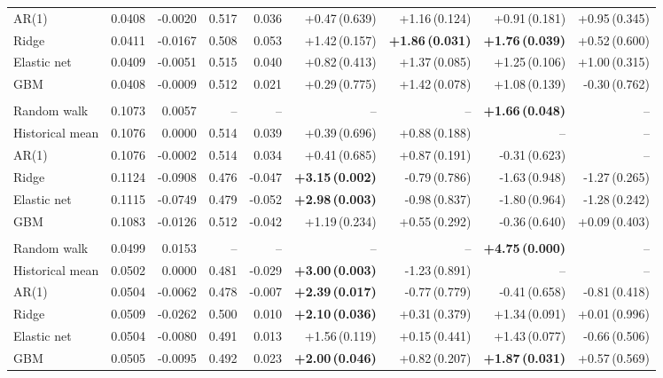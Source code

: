 \begin{tabular}{lrrrrrrrr}
\quad AR(1) & 0.0408 & -0.0020 & 0.517 & 0.036 & +0.47\,(0.639) & +1.16\,(0.124) & +0.91\,(0.181) & +0.95\,(0.345) \\
\quad Ridge & 0.0411 & -0.0167 & 0.508 & 0.053 & +1.42\,(0.157) & \textbf{+1.86\,(0.031)} & \textbf{+1.76\,(0.039)} & +0.52\,(0.600) \\
\quad Elastic net & 0.0409 & -0.0051 & 0.515 & 0.040 & +0.82\,(0.413) & +1.37\,(0.085) & +1.25\,(0.106) & +1.00\,(0.315) \\
\quad GBM & 0.0408 & -0.0009 & 0.512 & 0.021 & +0.29\,(0.775) & +1.42\,(0.078) & +1.08\,(0.139) & -0.30\,(0.762) \\
\addlinespace
\multicolumn{9}{l}{\emph{ETH, $h=7$}} \\
\quad Random walk & 0.1073 & 0.0057 & -- & -- & -- & -- & \textbf{+1.66\,(0.048)} & -- \\
\quad Historical mean & 0.1076 & 0.0000 & 0.514 & 0.039 & +0.39\,(0.696) & +0.88\,(0.188) & -- & -- \\
\quad AR(1) & 0.1076 & -0.0002 & 0.514 & 0.034 & +0.41\,(0.685) & +0.87\,(0.191) & -0.31\,(0.623) & -- \\
\quad Ridge & 0.1124 & -0.0908 & 0.476 & -0.047 & \textbf{+3.15\,(0.002)} & -0.79\,(0.786) & -1.63\,(0.948) & -1.27\,(0.265) \\
\quad Elastic net & 0.1115 & -0.0749 & 0.479 & -0.052 & \textbf{+2.98\,(0.003)} & -0.98\,(0.837) & -1.80\,(0.964) & -1.28\,(0.242) \\
\quad GBM & 0.1083 & -0.0126 & 0.512 & -0.042 & +1.19\,(0.234) & +0.55\,(0.292) & -0.36\,(0.640) & +0.09\,(0.403) \\
\addlinespace
\multicolumn{9}{l}{\emph{SOL, $h=1$}} \\
\quad Random walk & 0.0499 & 0.0153 & -- & -- & -- & -- & \textbf{+4.75\,(0.000)} & -- \\
\quad Historical mean & 0.0502 & 0.0000 & 0.481 & -0.029 & \textbf{+3.00\,(0.003)} & -1.23\,(0.891) & -- & -- \\
\quad AR(1) & 0.0504 & -0.0062 & 0.478 & -0.007 & \textbf{+2.39\,(0.017)} & -0.77\,(0.779) & -0.41\,(0.658) & -0.81\,(0.418) \\
\quad Ridge & 0.0509 & -0.0262 & 0.500 & 0.010 & \textbf{+2.10\,(0.036)} & +0.31\,(0.379) & +1.34\,(0.091) & +0.01\,(0.996) \\
\quad Elastic net & 0.0504 & -0.0080 & 0.491 & 0.013 & +1.56\,(0.119) & +0.15\,(0.441) & +1.43\,(0.077) & -0.66\,(0.506) \\
\quad GBM & 0.0505 & -0.0095 & 0.492 & 0.023 & \textbf{+2.00\,(0.046)} & +0.82\,(0.207) & \textbf{+1.87\,(0.031)} & +0.57\,(0.569) \\

\end{tabular}
